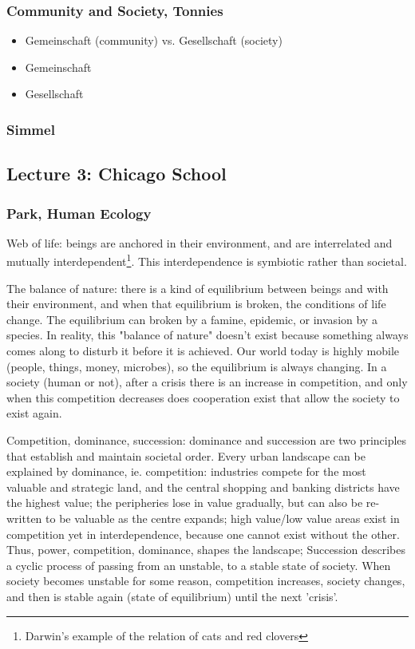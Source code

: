 \documentclass{article}
\begin{document}
\subsubsection{Community and Society, Tonnies}

\begin{itemize}
  \item Gemeinschaft (community) vs. Gesellschaft (society)
  \item Gemeinschaft
  \item Gesellschaft
\end{itemize}

\subsubsection{Simmel}


\subsection{Lecture 3: Chicago School}


\subsubsection{Park, Human Ecology}

Web of life: beings are anchored in their environment, and are interrelated and mutually interdependent\footnote{Darwin's example of the relation of cats and red clovers}. This interdependence is symbiotic rather than societal. 

The balance of nature: there is a kind of equilibrium between beings and with their environment, and when that equilibrium is broken, the conditions of life change. The equilibrium can broken by a famine, epidemic, or invasion by a species. In reality, this "balance of nature" doesn't exist because something always comes along to disturb it before it is achieved. Our world today is highly mobile (people, things, money, microbes), so the equilibrium is always changing. In a society (human or not), after a crisis there is an increase in competition, and only when this competition decreases does cooperation exist that allow the society to exist again.

Competition, dominance, succession: dominance and succession are two principles that establish and maintain societal order. Every urban landscape can be explained by dominance, ie. competition: industries compete for the most valuable and strategic land, and the central shopping and banking districts have the highest value; the peripheries lose in value gradually, but can also be re-written to be valuable as the centre expands; high value/low value areas exist in competition yet in interdependence, because one cannot exist without the other. Thus, power, competition, dominance, shapes the landscape;
Succession describes a cyclic process of passing from an unstable, to a stable state of society. When society becomes unstable for some reason, competition increases, society changes, and then is stable again (state of equilibrium) until the next 'crisis'.
\end{document}
